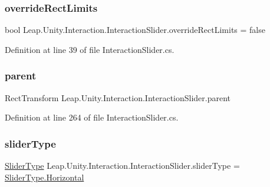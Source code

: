 \subsubsection{\texorpdfstring{overrideRectLimits}{overrideRectLimits}}
{\footnotesize\ttfamily bool Leap.\+Unity.\+Interaction.\+Interaction\+Slider.\+override\+Rect\+Limits = false}



Definition at line 39 of file Interaction\+Slider.\+cs.

\mbox{\label{class_leap_1_1_unity_1_1_interaction_1_1_interaction_slider_a8db525944d09fcb639d3808153307691}} 
\subsubsection{\texorpdfstring{parent}{parent}}
{\footnotesize\ttfamily Rect\+Transform Leap.\+Unity.\+Interaction.\+Interaction\+Slider.\+parent\hspace{0.3cm}{\ttfamily [protected]}}



Definition at line 264 of file Interaction\+Slider.\+cs.

\mbox{\label{class_leap_1_1_unity_1_1_interaction_1_1_interaction_slider_a7d25fc4d3c00bacc32c01b4c55cac68b}} 
\subsubsection{\texorpdfstring{sliderType}{sliderType}}
{\footnotesize\ttfamily \mbox{\hyperlink{class_leap_1_1_unity_1_1_interaction_1_1_interaction_slider_ae3fefc578d521cc71c2ea5d222e01748}{Slider\+Type}} Leap.\+Unity.\+Interaction.\+Interaction\+Slider.\+slider\+Type = \mbox{\hyperlink{class_leap_1_1_unity_1_1_interaction_1_1_interaction_slider_ae3fefc578d521cc71c2ea5d222e01748ac1b5fa03ecdb95d4a45dd1c40b02527f}{Slider\+Type.\+Horizontal}}}



